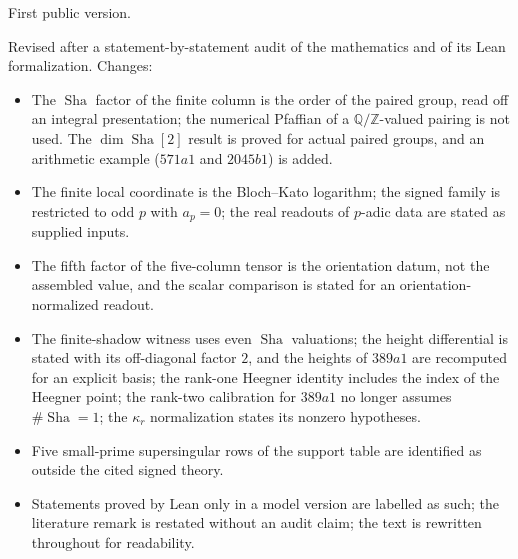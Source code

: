 \documentclass[11pt]{article}
\theoremstyle{definition}
\newcommand{\Q}{\mathbb{Q}}
\newcommand{\Z}{\mathbb{Z}}
\newcommand{\Sha}{\operatorname{Sha}}
\newcommand{\kapr}{\kappa_r}
\begin{document}
\begin{description}[leftmargin=2.4em, style=nextline]
\item[v1, 31 August 2026] First public version.
\item[v2, 4 October 2026] Revised after a statement-by-statement audit
  of the mathematics and of its Lean formalization.  Changes:
  \begin{itemize}
  \item The $\Sha$ factor of the finite column is the order of the paired
    group, read off an integral presentation; the numerical Pfaffian of a
    $\Q/\Z$-valued pairing is not used.  The $\dim\Sha[2]$ result is
    proved for actual paired groups, and an arithmetic example
    ($571a1$ and $2045b1$) is added.
  \item The finite local coordinate is the Bloch--Kato logarithm; the
    signed family is restricted to odd $p$ with $a_p=0$; the real readouts
    of $p$-adic data are stated as supplied inputs.
  \item The fifth factor of the five-column tensor is the orientation
    datum, not the assembled value, and the scalar comparison is stated
    for an orientation-normalized readout.
  \item The finite-shadow witness uses even $\Sha$ valuations; the height
    differential is stated with its off-diagonal factor $2$, and the
    heights of $389a1$ are recomputed for an explicit basis; the
    rank-one Heegner identity includes the index of the Heegner point;
    the rank-two calibration for $389a1$ no longer assumes
    $\#\Sha=1$; the $\kapr$ normalization states its nonzero hypotheses.
  \item Five small-prime supersingular rows of the support table are
    identified as outside the cited signed theory.
  \item Statements proved by Lean only in a model version are labelled
    as such; the literature remark is restated without an audit claim;
    the text is rewritten throughout for readability.
  \end{itemize}
\end{description}
 
\end{document}
